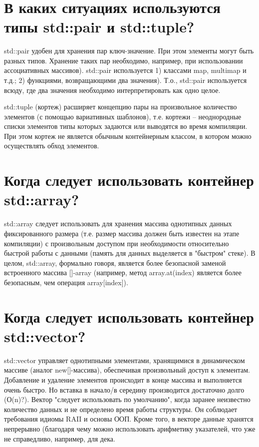 \documentclass[a4paper,12pt]{article}	%
\title{
	\center{\textbf{Контрольные вопросы. Задание 13.}}
	}
\begin{document}

\maketitle

\section{В каких ситуациях используются типы std::pair и std::tuple?}

	std::pair удобен для хранения пар ключ-значение. При этом элементы могут быть разных типов. Хранение таких пар необходимо, например, при использовании ассоциативных массивов). std::pair используется 1) классами map, multimap и т.д.; 2) функциями, возвращающими два значения). Т.о., std::pair используется всюду, где два значения необходимо интерпретировать как одно целое.
	
	std::tuple (кортеж) расширяет концепцию пары на произвольное количество элементов (с помощью вариативных шаблонов), т.е. кортежи -- неоднородные списки элементов типы которых задаются или выводятся во время компиляции. При этом кортеж не является обычным контейнерным классом, в котором можно осуществлять обход элементов.

\section{Когда следует использовать контейнер std::array?}

	std::array следует использовать для хранения массива однотипных данных фиксированного размера (т.е. размер массива должен быть известен на этапе компиляции) с произвольным доступом при необходимости относительно быстрой работы с данными (память для данных выделяется в "быстром" стеке). В целом, std::array, формально говоря, является более безопасной заменой встроенного массива []-array (например, метод array.at(index) является более безопасным, чем операция array[index]).

\section{Когда следует использовать контейнер std::vector?}

	std::vector управляет однотипными элементами, хранящимися в динамическом массиве (аналог new[]-массива), обеспечивая произвольный доступ к элементам. Добавление и удаление элементов происходит в конце массива и выполняется очень быстро. Но вставка в начало/в середину производится достаточно долго (О(n)?). Вектор "следует использовать по умолчанию", когда заранее неизвестно количество данных и не определено время работы структуры. Он соблюдает требования идиомы RAII и основы ООП. Кроме того, в векторе данные хранятся непрерывно (благодаря чему можно использовать арифметику указателей, что уже не справедливо, например, для дека.
\end{document}
